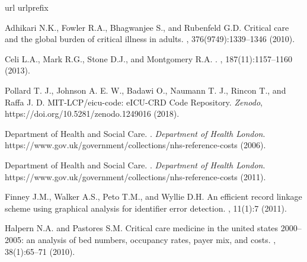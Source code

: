 \documentclass[english]{article}
\begin{document}
\clearpage
\begin{thebibliography}{1}
\expandafter\ifx\csname url\endcsname\relax
  \def\url#1{\texttt{#1}}\fi
\expandafter\ifx\csname urlprefix\endcsname\relax\def\urlprefix{URL }\fi
\providecommand{\bibinfo}[2]{#2}
\providecommand{\eprint}[2][]{\url{#2}}

Adhikari N.K., Fowler R.A., Bhagwanjee S., and Rubenfeld G.D.
\newblock Critical care and the global burden of critical illness in adults.
, 376(9749):1339--1346 (2010).

Celi L.A., Mark R.G., Stone D.J., and Montgomery R.A.
.
, 187(11):1157--1160 (2013).


Pollard T. J., Johnson A. E. W., Badawi O., Naumann T. J., Rincon T., and Raffa J. D.
\newblock MIT-LCP/eicu-code: eICU-CRD Code Repository.
\newblock \emph{Zenodo}, https://doi.org/10.5281/zenodo.1249016 (\bibinfo{year}{2018}).

{Department of Health and Social Care}.
.
\newblock \emph{Department of Health London}. https://www.gov.uk/government/collections/nhs-reference-costs  (\bibinfo{year}{2006}).

{Department of Health and Social Care}.
.
\newblock \emph{Department of Health London}. https://www.gov.uk/government/collections/nhs-reference-costs (\bibinfo{year}{2011}).

Finney J.M., Walker A.S., Peto T.M., and Wyllie D.H.
\newblock An efficient record linkage scheme using graphical analysis for
  identifier error detection.
, 11(1):7 (\bibinfo{year}{2011}).

Halpern N.A. and Pastores S.M.
\newblock Critical care medicine in the united states 2000--2005: an analysis
  of bed numbers, occupancy rates, payer mix, and costs.
, 38(1):65--71 (\bibinfo{year}{2010}).


\end{thebibliography}
\end{document}
